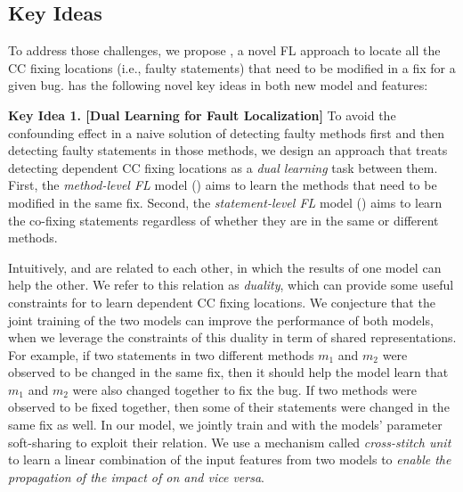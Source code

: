 \subsection{Key Ideas}
\label{sec:key-ideas}

To address those challenges, we propose {\tool}, a novel FL approach
to locate all the CC fixing locations (i.e., faulty statements) that need
to be modified in a fix for a given bug. {\tool} has the following
novel key ideas in both new model and features:

{\bf Key Idea 1. [Dual Learning for Fault Localization]} To avoid the
confounding effect in a naive solution of detecting faulty methods
first and then detecting faulty statements in those methods, we design
an approach that treats detecting dependent CC fixing locations as a
{\em dual learning} task between them. First, the {\em method-level
  FL} model () aims to learn the methods that need
to be modified in the same fix. Second, the {\em statement-level
  FL} model () aims to learn the co-fixing
statements regardless of whether they are in the same or different
methods.

Intuitively,  and  are related to each
other, in which the results of one model can help the other. We refer
to this relation as {\em duality}, which can provide some useful
constraints for {\tool} to learn dependent CC fixing locations.
%
We conjecture that the joint training of the two models can improve
the performance of both models, when we leverage the constraints of
this duality in term of shared representations. For example, if two
statements in two different methods $m_1$ and $m_2$ were observed to
be changed in the same fix, then it should help the model learn that
$m_1$ and $m_2$ were also changed together to fix the bug.  If two
methods were observed to be fixed together, then some of their
statements were changed in the same fix as well. In our model, we
jointly train  and  with the models'
parameter soft-sharing to exploit their relation. We use a mechanism
called {\em cross-stitch unit} to learn a linear combination of the
input features from two models to {\em enable the propagation of the impact
of  on  and vice versa}.




